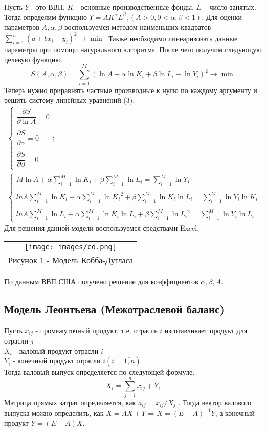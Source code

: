 Пусть $Y$ - это ВВП, $K$ - основные производственные фонды, $L$ – число занятых.
 Тогда определим функцию $Y=AK^{\alpha} L^{\beta},(A>0,0<\alpha,\beta<1)$.
Для оценки параметров $A,\alpha,\beta$ воспользуемся методом наименьших квадратов $\sum_{i=1}^n(a+b x_i-y_i )^2\to\min$. Также необходимо линеаризовать данные параметры при помощи натурального алгоритма. После чего получим следующую целевую функцию.
\begin{equation}
  S(A,\alpha,\beta)=\sum_{i=1}^M (\ln{A}+\alpha\ln{K_i}+\beta\ln{L_i}-\ln{Y_i})^2 \to\min
\end{equation}
Теперь нужно приравнять частные производные к нулю по каждому аргументу и решить систему линейных уравнений (3).
\begin{gather}
  \begin{cases}
  \dfrac{\partial S}{\partial \ln{A}}=0\\\\
  \dfrac{\partial S}{\partial \alpha}=0\\\\
  \dfrac{\partial S}{\partial \beta}=0
\end{cases};\\
\begin{cases}
  M\ln{A}+\alpha \sum_{i=1}^M\ln{K_i}+\beta \sum_{i=1}^M\ln{L_i}=\sum_{i=1}^M\ln{Y_i}\\\\
  ln{A}\sum_{i=1}^M\ln{K_i}+\alpha \sum_{i=1}^M\ln{K_i}^2+\beta\sum_{i=1}^M\ln{K_i}\ln{L_i}=\sum_{i=1}^M\ln{Y_i}\ln{K_i}\\\\
  ln{A}\sum_{i=1}^M\ln{L_i}+\alpha \sum_{i=1}^M\ln{K_i}\ln{L_i}+\beta\sum_{i=1}^M\ln{L_i}^2=\sum_{i=1}^M\ln{Y_i}\ln{L_i}
  \end{cases}
\end{gather}
Для решения данной модели воспользуемся средствами Excel.
\begin{center}
  \begin{tabular}{c}
    \texttt{[image: images/cd.png]}\\
    Рисунок 1 - Модель Кобба-Дугласа
  \end{tabular}
\end{center}
По данным ВВП США получено решение для коэффициентов $\alpha, \beta, A$.


\subsection{Модель Леонтьева (Межотраслевой баланс)}
Пусть $x_{ij}$ - промежуточный продукт, т.е. отрасль $i$ изготавливает продукт для отрасли $j$\\
$X_i$ - валовый продукт отрасли $i$\\
$Y_i$ - конечный продукт отрасли $i (i=\overline{1,n})$.\\
Тогда валовый выпуск определяется по следующей формуле.
\begin{equation}
X_i=\sum_{j=1}^nx_{ij}+Y_i
\end{equation}
Матрица прямых затрат определяется, как $a_{ij}=x_{ij}/X_j$ . Тогда вектор валового выпуска можно определить,
 как $X=AX+Y\Rightarrow X=(E-A)^{-1} Y$, а конечный продукт $Y=(E-A)X$.

